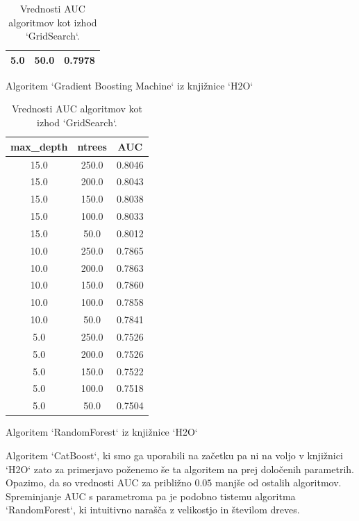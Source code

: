\documentclass{article}
\begin{document}
\begin{table}[H]
\begin{minipage}{0.3\textwidth}
\begin{tabular}{|c|c|c|}
5.0 & 50.0 & 0.7978 \\
\hline
\end{tabular}
\caption{Algoritem `Gradient Boosting Machine` iz knjižnice `H2O`}
\end{minipage}
\hfill
\begin{minipage}{0.3\textwidth}
\centering
\begin{tabular}{|c|c|c|}
\hline
\textbf{max\_depth} & \textbf{ntrees} & \textbf{AUC} \\
\hline
15.0 & 250.0 & 0.8046 \\
15.0 & 200.0 & 0.8043 \\
15.0 & 150.0 & 0.8038 \\
15.0 & 100.0 & 0.8033 \\
15.0 & 50.0 & 0.8012 \\
10.0 & 250.0 & 0.7865 \\
10.0 & 200.0 & 0.7863 \\
10.0 & 150.0 & 0.7860 \\
10.0 & 100.0 & 0.7858 \\
10.0 & 50.0 & 0.7841 \\
5.0 & 250.0 & 0.7526 \\
5.0 & 200.0 & 0.7526 \\
5.0 & 150.0 & 0.7522 \\
5.0 & 100.0 & 0.7518 \\
5.0 & 50.0 & 0.7504 \\
\hline
\end{tabular}
\caption{Algoritem `RandomForest` iz knjižnice `H2O`}
\end{minipage}
\caption{Vrednosti AUC algoritmov kot izhod `GridSearch`.}
\end{table}
Algoritem `CatBoost`, ki smo ga uporabili na začetku pa ni na voljo v knjižnici `H2O` zato za primerjavo poženemo še ta algoritem na prej določenih parametrih. Opazimo, da so vrednosti AUC za približno $0.05$ manjše od ostalih algoritmov. Spreminjanje AUC s parametroma pa je podobno tistemu algoritma `RandomForest`, ki intuitivno narašča z velikostjo in številom dreves. 
\end{document}
